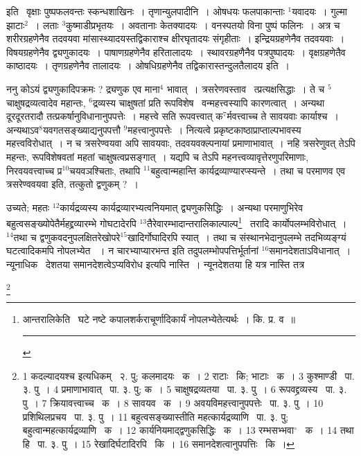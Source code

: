 \documentclass[11pt, openany]{book}
\newcommand\blfootnote[1]{%
 \begingroup
 \renewcommand\thefootnote{}\footnote{#1}%
 \addtocounter{footnote}{-1}%
 \endgroup
}
\begin{document}
\newpage
\noindent
इति \textendash\ वृक्षाः पुष्पफलवन्तः स्कन्धशाखिनः~। तृणान्युलपादीनि~। ओषधयः फलपाकान्ताः ${}^1$यवादयः~। गुल्मा झाटाः$^2$~। लताः ${}^3$कुष्माडीप्रभृतयः~। अवतानाः केतक्यादयः~। वनस्पतयो विना पुष्पं फलिनः~। अत्र च शरीरग्रहणेनैव तदवयवा मांसास्थ्यादयस्तद्विकाराश्च क्षीरघृतादयः संगृहीताः~। इन्द्रियग्रहणेनैव तदवयवाः~। विषयग्रहणेनैव द्व्यणुकादयः~। पाषाणग्रहणेनैव हरितालादयः~। स्थावरग्रहणैनैव पत्रपुष्पादयः~। वृक्षग्रहणेतैव काष्ठादयः~। तृणग्रहणेनैव तालादयः~। ओषधिग्रहणेनैव तद्विकारास्तन्दुलतैलादय इति~।

ननु कोऽयं द्व्यणुकादिपक्रमः ? द्र्यणुक एव माना$^4$ भावात्~। त्रसरेणवस्ताव \textendash\ त्प्रत्यक्षसिद्धाः~। ते च ${}^5$चाक्षुषद्रव्यत्वादेव महान्तः, ${}^6$द्रव्यस्य चाक्षुषतां प्रति रूपविशेष \textendash\ वन्महत्त्वस्यापि कारणत्वात्~। अन्यथा दूरदूरतरादौ तत्प्रकर्षानुविधानानुपपत्तेः~। महत्त्वे सति रूपवत्त्वात् क$^7$र्मवत्त्वाच्च ते सावयवाः कार्याश्च~। अन्यथाऽव$^8$यवगतसङ्ख्याद्यनुपपत्तौ ${}^9$महत्त्वानुपपत्तेः~। नित्यत्वे प्रकृष्टकाष्ठाप्राप्ताल्पभावस्य महत्त्वविरोधात्~। न च त्रसरेण्वयवा अपि सावयवाः, तदवयवक्ल्पनायां प्रमाणाभावात्~। नहि त्रसरेणुवत् तेऽपि महन्तः, रूपविशेषवतां महतां चाक्षुषत्वप्रसङ्गात्~। यद्यपि च तेऽपि महनत्त्वव्यावृत्तेरणुपरिमाणाः, निरवयवत्त्वाच्च प्र$^10$चयवञश्चिताः, तथापि ${}^11$बहुत्वान्महान्ति कार्यद्रव्याण्यारप्स्यन्ते~। तथा च परमाणव एव त्रसरेण्ववयवा इति, तत्कुतो द्वणुकम् ?~।

\begin{sloppypar}
उच्यते; महतः ${}^12$कार्यद्रव्यस्य कार्यद्रव्यारभ्यत्वनियमात् द्व्यणुकसिद्धिः~। अन्यथा परमाणुभिरेव बहुत्वसङ्ख्योपेतैर्महद्द्रव्यारम्भे गोघटादेरपि ${}^13$तैरेवारम्भादान्तरालिकाल्पाल्प\renewcommand{\thefootnote}{१}\footnote{आन्तरालिकेति  \textendash\ घटे नष्टे कपालशर्कराचूर्णादिकार्यं नोपलभ्येतेत्यर्थः~। कि. प्र. व~॥\\ \rule{0.4\linewidth}{0.5pt}}  \textendash\ तरादि कार्योपलम्भविरोधात्~। ${}^14$तथा च द्वणुकवदनुपलक्षितरेखोपरे$^15$खादिर्गोघादिरपि स्यात्~। तथा च संस्थानभेदानुपलम्भे तदभिव्यङ्ग्यं घटत्वादिकमपि नोपलभ्येत ~। न चारभ्याप्यारभन्त इति तदुपलम्भोपपत्तिर्भूर्तानां ${}^16$समानदेशताऽविधानात्~। न्यूनाधिक \textendash\ देशतया समानदेशत्वेऽप्यविरोध इत्यपि नास्ति~। न्यूनदेशतया हि यत्र नास्ति तत्र 
\end{sloppypar}

\blfootnote{1 कदल्यादयश्च इत्यधिकम्  \textendash\ २. पु; कलमादयः  \textendash\ क~। 2 राटाः  \textendash\ कि; भाटाः  \textendash\ क~। 3 कुश्माण्डी  \textendash\ पा. ३. पु~। 4 प्रमाणाभावात्  \textendash\ पा. ३. पु; क~। 5 चाक्षुषद्रव्यतया  \textendash\ पा. ३. पु~। 6 रूपवद्द्रव्यस्य  \textendash\ पा. ३. पु~। 7 क्रियावत्त्वाच्च  \textendash\ क~। 8 सावयव  \textendash\ क~। 9 अवयविमहत्त्वानुपपत्तेः  \textendash\ पा. ३. पु~। 10 प्रशिथिलप्रचय  \textendash\ पा. ३. पु~। 11 बहुत्वसङ्ख्यास्तीति महत्कार्यद्रव्याणि  \textendash\ पा. ३. पु; बहुत्वान्महत्कार्यद्रव्याणि \textendash\ क~। 12 कार्यनियमाद्द्वणुकसिद्धिः  \textendash\ क~। 13 रम्भसभ्भवा$^\circ$ \textendash\ क~। 14 तथा हि  \textendash\ पा. ३. पु~। 15 रेखादिर्घटादिरपि  \textendash\ कि~। 16 समानदेशत्वानुपपत्तिः  \textendash\ कि~।}
\end{document}
